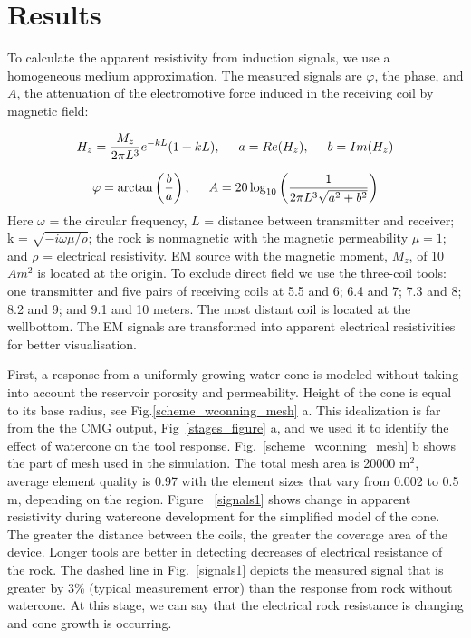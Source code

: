 \documentclass{eage19}
\begin{document}
\section{Results}

To calculate the apparent  resistivity from induction signals, we use a homogeneous medium approximation. The measured signals are $\varphi$, the phase, and $A$, the attenuation  of the electromotive force induced in the receiving coil by magnetic field:

\begin{equation}
H_{z} = \frac{M_{z}}{2\pi L^3}e^{-kL}(1+kL), \hspace{0.5cm}
a = Re(H_{z}) , \hspace{0.5cm}
b = Im(H_{z})
\end{equation}

\begin{equation}
\varphi = \arctan \left( \frac{b}{a} \right), \hspace{0.5cm}
A = 20 \log_{10} \left( \frac{1}{2\pi L^3 \sqrt{a^2+b^2}} \right)
\label{varphi}
\end{equation}
Here $\omega$ = the circular frequency, $L$ = distance between transmitter and receiver;  k =  $\sqrt{- i \omega \mu /\rho}$; the rock is nonmagnetic with the magnetic permeability $\mu= 1$; and $\rho$ = electrical resistivity. EM source with the magnetic moment, $M_{z}$, of 10 $Am^2$ is located at the origin. To exclude direct field we use the three-coil tools: one transmitter and five pairs of receiving coils at 5.5 and 6; 6.4 and 7; 7.3 and 8; 8.2 and 9; and 9.1 and 10 meters. The most distant coil is located at the wellbottom. The EM signals are  transformed into apparent electrical resistivities for better visualisation.

First, a response from a uniformly growing water cone is modeled without taking into account the reservoir porosity and permeability. Height of the cone is equal to its base radius, see Fig.\ref{scheme_wconning_mesh} a. This idealization is far from the the CMG output, Fig~\ref{stages_figure} a, and we used it to identify the effect of watercone on the tool response. Fig.~\ref{scheme_wconning_mesh} b shows the part of mesh used in the simulation. The total mesh area is 20000 m$^2$, average element quality is 0.97 with the element sizes that vary from 0.002 to 0.5 m, depending on the region. Figure ~\ref{signals1} shows change in apparent resistivity during watercone development for the simplified model of the cone. The greater the distance between the coils, the greater the coverage area of the device. Longer tools are better in detecting decreases of electrical resistance of the rock. The dashed line in Fig.~\ref{signals1} depicts the measured signal that is greater by 3\% (typical measurement error) than the response from rock without watercone. At this stage, we can say that the electrical rock resistance is changing and cone growth is occurring.
\end{document}
